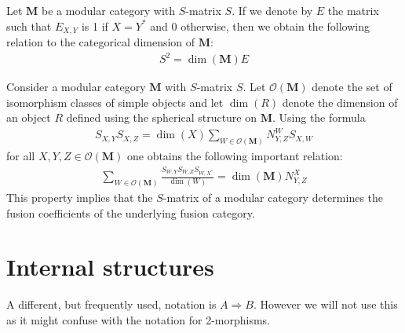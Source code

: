 	
	\begin{property}
		Let $\mathbf{M}$ be a modular category with $S$-matrix $S$. If we denote by $E$ the matrix such that $E_{X, Y}$ is 1 if $X=Y^*$ and 0 otherwise, then we obtain the following relation to the categorical dimension of $\mathbf{M}$:
		\begin{gather}
			S^2 = \dim(\mathbf{M})E
		\end{gather}
	\end{property}
	
	\begin{formula}[Verlinde]
		Consider a modular category $\mathbf{M}$ with $S$-matrix $S$. Let $\mathcal{O}(\mathbf{M})$ denote the set of isomorphism classes of simple objects and let $\dim(R)$ denote the dimension of an object $R$ defined using the spherical structure on $\mathbf{M}$. Using the formula
		\begin{gather}
			S_{X, Y}S_{X, Z} = \dim(X)\sum_{W\in\mathcal{O}(\mathbf{M})}N_{Y, Z}^WS_{X, W}
		\end{gather}
		for all $X, Y, Z\in\mathcal{O}(\mathbf{M})$ one obtains the following important relation:
		\begin{gather}
			\sum_{W\in\mathcal{O}(\mathbf{M})}\frac{S_{W, Y}S_{W, Z}S_{W, X^*}}{\dim(W)} = \dim(\mathbf{M})N_{Y, Z}^X
		\end{gather}
		This property implies that the $S$-matrix of a modular category determines the fusion coefficients of the underlying fusion category.
	\end{formula}

\section{Internal structures}

	\begin{notation}
		A different, but frequently used, notation is $A\Rightarrow B$. However we will not use this as it might confuse with the notation for 2-morphisms.
	\end{notation}
	
